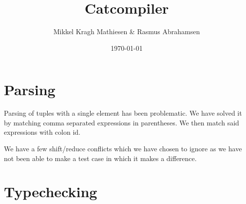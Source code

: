 \documentclass{article}
\author{Mikkel Kragh Mathiesen \& Rasmus Abrahamsen}
\title{Catcompiler}
\date{\today}
\begin{document}
\maketitle

\section{Parsing}

Parsing of tuples with a single element has been problematic. We have solved it by matching comma separated expressions in parentheses. We then match said expressions with colon id.

We have a few shift/reduce conflicts which we have chosen to ignore as we have not been able to make a test case in which it makes a difference.

\section{Typechecking}
\end{document}
